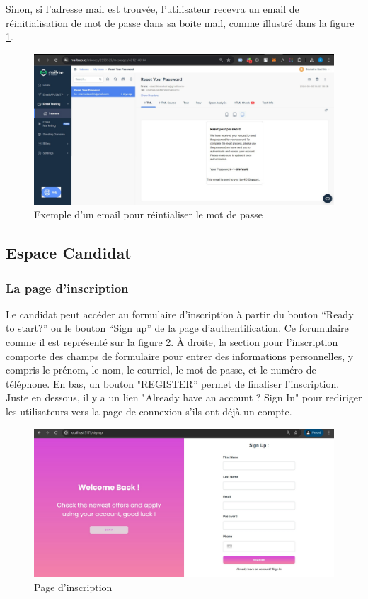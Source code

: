 Sinon, si l'adresse mail est trouvée, l'utilisateur recevra
un email de réinitialisation de mot de passe dans sa boite mail, comme illustré dans la figure \ref{fig:mailPass}.

\begin{figure}[htbp]
   \centering
   \includegraphics[scale=0.26]{screens/mailForgot.png} 
   \caption{Exemple d'un email pour réintialiser le mot de passe}
   \label{fig:mailPass}
\end{figure}

\subsection{Espace Candidat}
\subsubsection{La page d’inscription}
Le candidat peut accéder au formulaire d’inscription à partir du bouton 
“Ready to start?” ou le bouton “Sign up” de la page d’authentification. 
Ce forumulaire comme il est représenté sur la figure \ref{fig:singup}. 
À droite, la section pour l'inscription comporte des champs de 
formulaire pour entrer des informations personnelles, 
y compris le prénom, le nom, le courriel, le mot de  passe, et  
le numéro de téléphone. En bas, un bouton "REGISTER” permet de finaliser 
l'inscription. Juste en dessous, il y a un lien "Already have an account ? Sign In" 
pour rediriger les utilisateurs vers la page de connexion s’ils ont déjà 
un compte.

\begin{figure}[htbp]
   \centering
   \includegraphics[scale=0.4]{screens/signup.jpg} 
   \caption{Page d'inscription}
   \label{fig:singup}
\end{figure}

